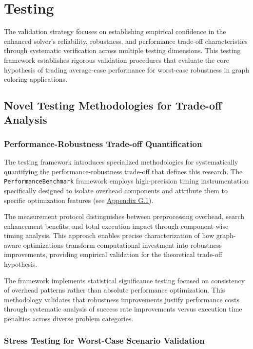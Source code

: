 \section{Testing}
\label{sec:testing}

The validation strategy focuses on establishing empirical confidence in the enhanced solver's reliability, robustness, and performance trade-off characteristics through systematic verification across multiple testing dimensions. This testing framework establishes rigorous validation procedures that evaluate the core hypothesis of trading average-case performance for worst-case robustness in graph coloring applications.

\subsection{Novel Testing Methodologies for Trade-off Analysis}
\label{sec:novel-testing-methodologies}

\subsubsection{Performance-Robustness Trade-off Quantification}
\label{sec:tradeoff-quantification}

The testing framework introduces specialized methodologies for systematically quantifying the performance-robustness trade-off that defines this research. The \texttt{PerformanceBenchmark} framework employs high-precision timing instrumentation specifically designed to isolate overhead components and attribute them to specific optimization features (see \hyperref[appendix:tradeoff-measurement]{Appendix G.1}).

The measurement protocol distinguishes between preprocessing overhead, search enhancement benefits, and total execution impact through component-wise timing analysis. This approach enables precise characterization of how graph-aware optimizations transform computational investment into robustness improvements, providing empirical validation for the theoretical trade-off hypothesis.

The framework implements statistical significance testing focused on consistency of overhead patterns rather than absolute performance optimization. This methodology validates that robustness improvements justify performance costs through systematic analysis of success rate improvements versus execution time penalties across diverse problem categories.

\subsubsection{Stress Testing for Worst-Case Scenario Validation}
\label{sec:stress-testing}

